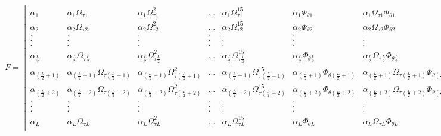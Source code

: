 $
F
=
\begin{bmatrix}
\alpha_{1} & \alpha_{1} \Omega_{\tau 1} & \alpha_{1} \Omega^{2}_{\tau 1} & ... & \alpha_{1} \Omega^{15}_{\tau 1} & \alpha_{1} \Phi_{\theta 1} & \alpha_{1} \Omega_{\tau 1} \Phi_{\theta 1} & \alpha_{1} \Omega^{2}_{\tau 1} \Phi_{\theta 1} & ... & \alpha_{1} \Omega^{15}_{\tau 1} \Phi_{\theta 1} \\
\alpha_{2} & \alpha_{2} \Omega_{\tau 2} & \alpha_{2} \Omega^{2}_{\tau 2} & ... & \alpha_{2} \Omega^{15}_{\tau 2} & \alpha_{2} \Phi_{\theta 2} & \alpha_{2} \Omega_{\tau 2} \Phi_{\theta 2} & \alpha_{2} \Omega^{2}_{\tau 2} \Phi_{\theta 2} & ... & \alpha_{2} \Omega^{15}_{\tau 2} \Phi_{\theta 2} \\
. & . & . & . & . & . & . & . & . & . \\
. & . & . & . & . & . & . & . & . & . \\
. & . & . & . & . & . & . & . & . & . \\
\alpha_{\frac{L}{2}} & \alpha_{\frac{L}{2}} \Omega_{\tau \frac{L}{2}} & \alpha_{\frac{L}{2}} \Omega^{2}_{\tau \frac{L}{2}} & ... & \alpha_{\frac{L}{2}} \Omega^{15}_{\tau \frac{L}{2}} & \alpha_{\frac{L}{2}} \Phi_{\theta \frac{L}{2}} & \alpha_{\frac{L}{2}} \Omega_{\tau \frac{L}{2}} \Phi_{\theta \frac{L}{2}} & \alpha_{\frac{L}{2}} \Omega^{2}_{\tau \frac{L}{2}} \Phi_{\theta \frac{L}{2}} & ... & \alpha_{\frac{L}{2}} \Omega^{15}_{\tau \frac{L}{2}} \Phi_{\theta \frac{L}{2}} \\
\alpha_{(\frac{L}{2} + 1)} & \alpha_{(\frac{L}{2} + 1)} \Omega_{\tau (\frac{L}{2} + 1)} & \alpha_{(\frac{L}{2} + 1)} \Omega^{2}_{\tau (\frac{L}{2} + 1)} & ... & \alpha_{(\frac{L}{2} + 1)} \Omega^{15}_{\tau (\frac{L}{2} + 1)} & \alpha_{(\frac{L}{2} + 1)} \Phi_{\theta (\frac{L}{2} + 1)} & \alpha_{(\frac{L}{2} + 1)} \Omega_{\tau (\frac{L}{2} + 1)} \Phi_{\theta (\frac{L}{2} + 1)} & \alpha_{(\frac{L}{2} + 1)} \Omega^{2}_{\tau (\frac{L}{2} + 1)} \Phi_{\theta (\frac{L}{2} + 1)} & ... & \alpha_{(\frac{L}{2} + 1)} \Omega^{15}_{\tau (\frac{L}{2} + 1)} \Phi_{\theta (\frac{L}{2} + 1)} \\
\alpha_{(\frac{L}{2} + 2)} & \alpha_{(\frac{L}{2} + 2)} \Omega_{\tau (\frac{L}{2} + 2)} & \alpha_{(\frac{L}{2} + 2)} \Omega^{2}_{\tau (\frac{L}{2} + 2)} & ... & \alpha_{(\frac{L}{2} + 2)} \Omega^{15}_{\tau (\frac{L}{2} + 2)} & \alpha_{(\frac{L}{2} + 2)} \Phi_{\theta (\frac{L}{2} + 2)} & \alpha_{(\frac{L}{2} + 2)} \Omega_{\tau (\frac{L}{2} + 2)} \Phi_{\theta (\frac{L}{2} + 2)} & \alpha_{(\frac{L}{2} + 2)} \Omega^{2}_{\tau (\frac{L}{2} + 2)} \Phi_{\theta (\frac{L}{2} + 2)} & ... & \alpha_{(\frac{L}{2} + 2)} \Omega^{15}_{\tau (\frac{L}{2} + 2)} \Phi_{\theta (\frac{L}{2} + 2)} \\
. & . & . & . & . & . & . & . & . & . \\
. & . & . & . & . & . & . & . & . & . \\
. & . & . & . & . & . & . & . & . & . \\
\alpha_{L} & \alpha_{L} \Omega_{\tau L} & \alpha_{L} \Omega^{2}_{\tau L} & ... & \alpha_{L} \Omega^{15}_{\tau L} & \alpha_{L} \Phi_{\theta L} & \alpha_{L} \Omega_{\tau L} \Phi_{\theta L} & \alpha_{L} \Omega^{2}_{\tau L} \Phi_{\theta L} & ... & \alpha_{L} \Omega^{15}_{\tau L} \Phi_{\theta L} \\
\end{bmatrix}$